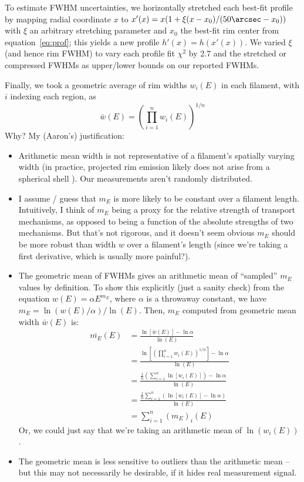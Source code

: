 \documentclass[12pt,preprint]{aastex}  %
\newcommand*\mean[1]{\bar{#1}}
\begin{document}
To estimate FWHM uncertainties, we horizontally stretched each best-fit
profile by mapping radial coordinate $x$ to
$x'(x) = x (1 + \xi (x-x_0)/(50\arcsec-x_0))$ with $\xi$ an arbitrary stretching
parameter and $x_0$ the best-fit rim center from equation~\eqref{eq:prof};
this yields a new profile $h'(x) = h(x'(x))$.
We varied $\xi$ (and hence rim FWHM) to vary each profile fit $\chi^2$ by 2.7
and the stretched or compressed FWHMs as upper/lower bounds on our reported
FWHMs.

Finally, we took a geometric average of rim widths $w_i(E)$ in each filament,
with $i$ indexing each region, as
\[
    \mean{w}(E) = \left( \prod_{i=1}^{n} w_i(E) \right)^{1/n}
\]
Why?  My (Aaron's) justification:
\begin{itemize}
\item Arithmetic mean width is not representative of a filament's
    spatially varying width (in practice, projected rim emission likely
    does not arise from a spherical shell \citep[c.f.][]{hester1987}).
    Our measurements aren't randomly distributed.
\item I assume / guess that $m_E$ is more likely to be constant over a
    filament length.  Intuitively, I think of $m_E$ being a proxy for the
    relative strength of transport mechanisms, as opposed to being a function
    of the absolute strengths of two mechanisms.  But that's not rigorous,
    and it doesn't seem obvious $m_E$ should be more robust than width $w$
    over a filament's length (since we're taking a first derivative, which
    is usually more painful?).
\item The geometric mean of FWHMs gives an arithmetic mean of ``sampled''
    $m_E$ values by definition.  To show this explicitly (just a sanity check)
    from the equation $w(E) = \alpha E^{m_E}$, where $\alpha$ is a throwaway
    constant, we have $m_E = \ln(w(E)/\alpha) / \ln(E)$.  Then, $m_E$ computed
    from geometric mean width $\mean{w}(E)$ is:
    \begin{align*}
        \mean{m_E}(E)
            &= \frac{\ln\left[ \mean{w}(E) \right] - \ln\alpha}{\ln(E)} \\
            &= \frac{\ln\left[ \left( \prod_{i=1}^{n} w_i(E) \right)^{1/n}
                        \right] - \ln\alpha}{\ln(E)} \\
            &= \frac{\frac{1}{n}\left(
                         \sum_{i=1}^{n} \ln\left[w_i(E)\right]
                     \right) - \ln\alpha}{\ln(E)} \\
            &= \frac{\frac{1}{n} \sum_{i=1}^{n}
                     \left( \ln\left[w_i(E)\right] - \ln\alpha \right)}
                    {\ln(E)} \\
            &= \sum_{i=1}^{n} (m_E)_i (E)
    \end{align*}
    Or, we could just say that we're taking an arithmetic mean of
    $\ln(w_i(E))$.
\item The geometric mean is less sensitive to outliers than the arithmetic
    mean -- but this may not necessarily be desirable, if it hides
    real measurement signal.
\end{itemize}
\end{document}
